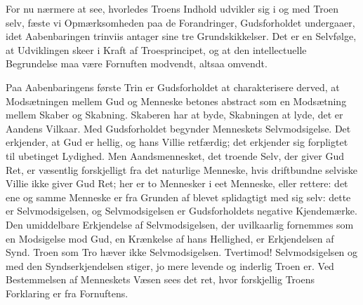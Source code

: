 \documentclass[12pt]{book}
\begin{document}
For nu nærmere at see, hvorledes Troens Indhold udvikler sig i og
med Troen selv, fæste vi Opmærksomheden paa de Forandringer,
Gudsforholdet undergaaer, idet Aabenbaringen trinviis antager sine
tre Grundskikkelser. Det er en Selvfølge, at Udviklingen skeer i
Kraft af Troesprincipet, og at den intellectuelle Begrundelse maa
være Fornuften modvendt, altsaa omvendt.

Paa Aabenbaringens første Trin er Gudsforholdet at charakterisere
derved, at Modsætningen mellem Gud og Menneske betones abstract som
en Modsætning mellem Skaber og Skabning. Skaberen har at byde,
Skabningen at lyde, det er Aandens Vilkaar. Med Gudsforholdet
begynder Menneskets Selvmodsigelse. Det erkjender, at Gud er hellig,
og hans Villie retfærdig; det erkjender sig
forpligtet til ubetinget Lydighed. Men Aandsmennesket, det troende
Selv, der giver Gud Ret, er væsentlig forskjelligt fra det naturlige
Menneske, hvis driftbundne selviske Villie ikke giver Gud Ret; her
er to Mennesker i eet Menneske, eller rettere: det ene og samme
Menneske er fra Grunden af blevet splidagtigt med sig selv: dette er
Selvmodsigelsen, og Selvmodsigelsen er Gudsforholdets negative
Kjendemærke. Den umiddelbare Erkjendelse af Selvmodsigelsen, der
uvilkaarlig fornemmes som en Modsigelse mod Gud, en Krænkelse af
hans Hellighed, er Erkjendelsen af Synd. Troen som Tro hæver ikke
Selvmodsigelsen. Tvertimod! Selvmodsigelsen og med den
Syndserkjendelsen stiger, jo mere levende og inderlig Troen er. Ved
Bestemmelsen af Menneskets Væsen sees det ret, hvor forskjellig
Troens Forklaring er fra Fornuftens.
\end{document}
